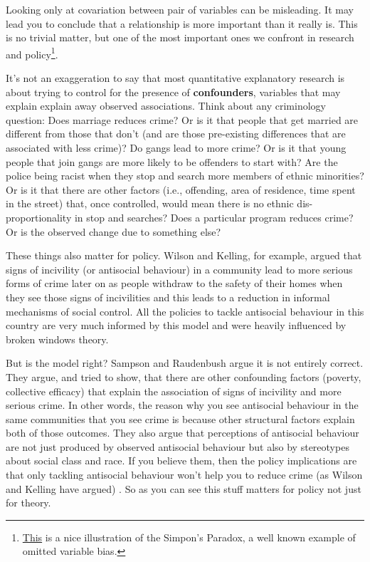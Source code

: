 \documentclass[]{book}
\begin{document}
Looking only at covariation between pair of variables can be misleading. It may lead you to conclude that a relationship is more important than it really is. This is no trivial matter, but one of the most important ones we confront in research and policy\footnote{\href{http://vudlab.com/simpsons/}{This} is a nice illustration of the Simpon's Paradox, a well known example of omitted variable bias.}.

It's not an exaggeration to say that most quantitative explanatory research is about trying to control for the presence of \textbf{confounders}, variables that may explain explain away observed associations. Think about any criminology question: Does marriage reduces crime? Or is it that people that get married are different from those that don't (and are those pre-existing differences that are associated with less crime)? Do gangs lead to more crime? Or is it that young people that join gangs are more likely to be offenders to start with? Are the police being racist when they stop and search more members of ethnic minorities? Or is it that there are other factors (i.e., offending, area of residence, time spent in the street) that, once controlled, would mean there is no ethnic dis-proportionality in stop and searches? Does a particular program reduces crime? Or is the observed change due to something else?

These things also matter for policy. Wilson and Kelling, for example, argued that signs of incivility (or antisocial behaviour) in a community lead to more serious forms of crime later on as people withdraw to the safety of their homes when they see those signs of incivilities and this leads to a reduction in informal mechanisms of social control. All the policies to tackle antisocial behaviour in this country are very much informed by this model and were heavily influenced by broken windows theory.

But is the model right? Sampson and Raudenbush argue it is not entirely correct. They argue, and tried to show, that there are other confounding factors (poverty, collective efficacy) that explain the association of signs of incivility and more serious crime. In other words, the reason why you see antisocial behaviour in the same communities that you see crime is because other structural factors explain both of those outcomes. They also argue that perceptions of antisocial behaviour are not just produced by observed antisocial behaviour but also by stereotypes about social class and race. If you believe them, then the policy implications are that only tackling antisocial behaviour won't help you to reduce crime (as Wilson and Kelling have argued) . So as you can see this stuff matters for policy not just for theory.
\end{document}

